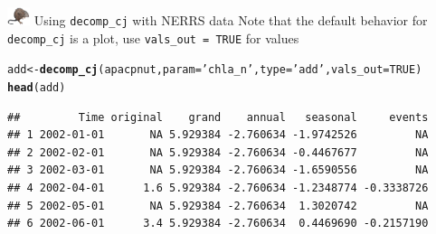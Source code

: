 \documentclass[xcolor=dvipsnames,serif]{beamer}\usepackage[]{graphicx}\usepackage[]{color}
\makeatletter
\newcommand{\hlnum}[1]{\textcolor[rgb]{0.686,0.059,0.569}{#1}}%
\newcommand{\hlstr}[1]{\textcolor[rgb]{0.192,0.494,0.8}{#1}}%
\newcommand{\hlstd}[1]{\textcolor[rgb]{0.345,0.345,0.345}{#1}}%
\newcommand{\hlkwb}[1]{\textcolor[rgb]{0.69,0.353,0.396}{#1}}%
\newcommand{\hlkwc}[1]{\textcolor[rgb]{0.333,0.667,0.333}{#1}}%
\newcommand{\hlkwd}[1]{\textcolor[rgb]{0.737,0.353,0.396}{\textbf{#1}}}%
\newenvironment{kframe}{%
 \def\at@end@of@kframe{}%
 \ifinner\ifhmode%
  \def\at@end@of@kframe{\end{minipage}}%
  \begin{minipage}{\columnwidth}%
 \fi\fi%
 \def\FrameCommand##1{\hskip\@totalleftmargin \hskip-\fboxsep
 \colorbox{shadecolor}{##1}\hskip-\fboxsep
     \hskip-\linewidth \hskip-\@totalleftmargin \hskip\columnwidth}%
 \MakeFramed {\advance\hsize-\width
   \@totalleftmargin\z@ \linewidth\hsize
   \@setminipage}}%
 {\par\unskip\endMakeFramed%
 \at@end@of@kframe}
\newenvironment{knitrout}{}{} %
\makeatother
\begin{document}
\begin{frame}[fragile]{\includegraphics[width = 0.05\textwidth]{imgs/swmprat.png} Using \texttt{decomp\_cj} with NERRS data}
Note that the default behavior for \texttt{decomp\_cj} is a plot, use \texttt{vals\_out = TRUE} for values
\begin{knitrout}\scriptsize
{}\color{fgcolor}\begin{kframe}
\begin{alltt}
\hlstd{add} \hlkwb{<-} \hlkwd{decomp_cj}\hlstd{(apacpnut,} \hlkwc{param} \hlstd{=} \hlstr{'chla_n'}\hlstd{,} \hlkwc{type} \hlstd{=} \hlstr{'add'}\hlstd{,} \hlkwc{vals_out} \hlstd{=} \hlnum{TRUE}\hlstd{)}
\hlkwd{head}\hlstd{(add)}
\end{alltt}
\begin{verbatim}
##         Time original    grand    annual   seasonal     events
## 1 2002-01-01       NA 5.929384 -2.760634 -1.9742526         NA
## 2 2002-02-01       NA 5.929384 -2.760634 -0.4467677         NA
## 3 2002-03-01       NA 5.929384 -2.760634 -1.6590556         NA
## 4 2002-04-01      1.6 5.929384 -2.760634 -1.2348774 -0.3338726
## 5 2002-05-01       NA 5.929384 -2.760634  1.3020742         NA
## 6 2002-06-01      3.4 5.929384 -2.760634  0.4469690 -0.2157190
\end{verbatim}
\end{kframe}
\end{knitrout}
\end{frame}
\end{document}
